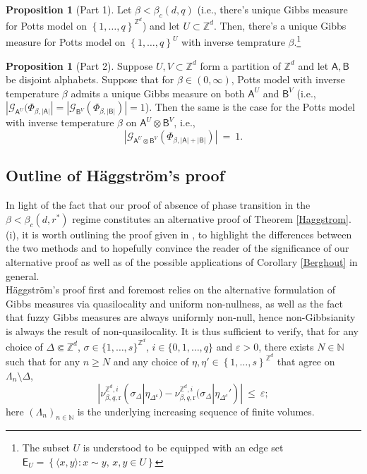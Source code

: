 \documentclass[12pt]{article}
\renewcommand{\AA}{\mathsf{A}}
\newcommand{\AB}{\mathsf{B}}
\newcommand{\E}{\mathsf{E}}
\newcommand{\G}{\mathcal{G}}
\newcommand{\N}{\mathbb{N}}
\renewcommand{\r}{\mathrm{r}}
\newcommand{\Z}{\mathbb{Z}}
\newcommand{\set}[1]{\left\{#1\right\}}
\newcommand{\1}{\mathbbm{1}}
\renewcommand{\sp}[1]{\langle #1\rangle}
\renewcommand{\c}{\mathsf{c}}
\newcommand{\5}{\vspace{0.5cm}}
\theoremstyle{definition}
\newtheorem{prop}[thm]{Proposition}
\begin{document}
\begin{prop}[Part 1]\label{FP:part1}
Let $\beta<\beta_c(d,q)$ (i.e., there's unique Gibbs measure for Potts model on $\set{1,\ldots,q}^{\Z^d}$) and let $U\subset\Z^d$. Then, there's a unique Gibbs measure for Potts model on $\set{1,\ldots,q}^U$ with inverse temprature $\beta$.\footnote{The subset $U$ is understood to be equipped with an edge set $\E_U=\set{\sp{x,y}:x\sim y,\,x,y\in U}$}
\end{prop}

\begin{prop}[Part 2]\label{FP:part2}
Suppose $U,V\subset\Z^d$ form a partition of $\Z^d$ and let $\AA,\AB$ be disjoint alphabets. Suppose that for $\beta\in(0,\infty)$, Potts model with inverse temperature $\beta$ admits a unique Gibbs measure on both $\AA^U$ and $\AB^V$ (i.e., $|\G_{\AA^U}(\Phi_{\beta,|\AA|}|=|\G_{\AB^V}(\Phi_{\beta,|\AB|})|=1$). Then the same is the case for the Potts model with inverse temperature $\beta$ on $\AA^U\otimes\AB^V$, i.e.,
$$|\G_{\AA^U\otimes\AB^V}(\Phi_{\beta,|\AA|+|\AB|})| ~=~ 1.$$
\end{prop}

\subsection{Outline of H\"aggstr\"om's proof}\label{ProofComparison}

In light of the fact that our proof of absence of phase transition in the $\beta<\beta_c(d,r^*)$ regime constitutes an alternative proof of Theorem \ref{Haggstrom}.(i), it is worth outlining the proof given in \cite{Hag}, to highlight the differences between the two methods and to hopefully convince the reader of the significance of our alternative proof as well as of the possible applications of Corollary \ref{Berghout} in general. \\

H\"aggstr\"om's proof first and foremost relies on the alternative formulation of Gibbs measures via quasilocality and uniform non-nullness, as well as the fact that fuzzy Gibbs measures are always uniformly non-null, hence non-Gibbsianity is always the result of non-quasilocality. It is thus sufficient to verify, that for any choice of $\Delta\Subset\Z^d$, $\sigma\in\{1,\ldots,s\}^{\Z^d}$, $i\in\{0,1,\ldots,q\}$ and $\varepsilon>0$, there exists $N\in\N$ such that for any $n\geq N$ and any choice of $\eta,\eta'\in\set{1,\ldots,s}^{\Z^d}$ that agree on $\Lambda_n\setminus\Delta$,
$$|\nu_{\beta,q,\r}^{\Z^d,i}(\sigma_{\Delta}|\eta_{\Delta^\c})-\nu_{\beta,q,\r}^{\Z^d,i}(\sigma_\Delta|\eta_{\Delta^c}')| ~\leq~ \varepsilon;$$
here $(\Lambda_n)_{n\in\N}$ is the underlying increasing sequence of finite volumes. \\
\end{document}
